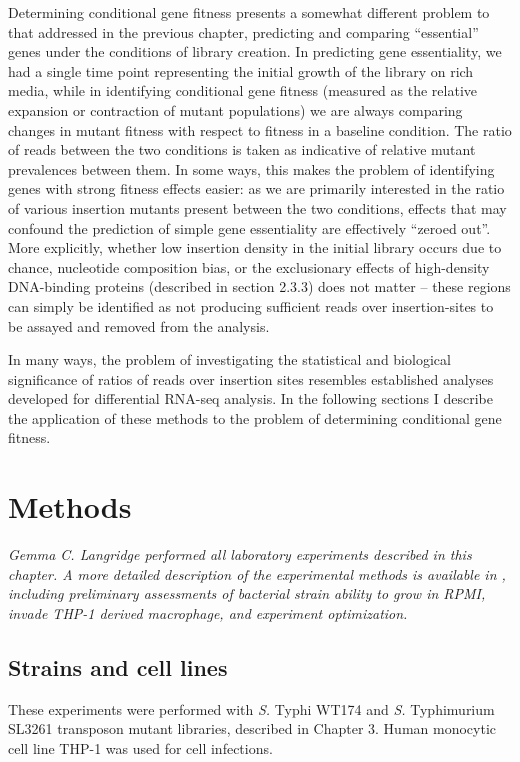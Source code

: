 Determining conditional gene fitness presents a somewhat different problem to that addressed in the previous chapter, predicting and comparing ``essential'' genes under the conditions of library creation. In predicting gene essentiality, we had a single time point representing the initial growth of the library on rich media, while in identifying conditional gene fitness (measured as the relative expansion or contraction of mutant populations) we are always comparing changes in mutant fitness with respect to fitness in a baseline condition. The ratio of reads between the two conditions is taken as indicative of relative mutant prevalences between them. In some ways, this makes the problem of identifying genes with strong fitness effects easier: as we are primarily interested in the ratio of various insertion mutants present between the two conditions, effects that may confound the prediction of simple gene essentiality are effectively ``zeroed out''. More explicitly, whether low insertion density in the initial library occurs due to chance, nucleotide composition bias, or the exclusionary effects of high-density DNA-binding proteins (described in section 2.3.3) does not matter -- these regions can simply be identified as not producing sufficient reads over insertion-sites to be assayed and removed from the analysis.

In many ways, the problem of investigating the statistical and biological significance of ratios of reads over insertion sites resembles established analyses developed for differential RNA-seq analysis. In the following sections I describe the application of these methods to the problem of determining conditional gene fitness.

\section{Methods}
\textit{Gemma C. Langridge performed all laboratory experiments described in this chapter. A more detailed description of the experimental methods is available in \textcite{Langridge2010}, including preliminary assessments of bacterial strain ability to grow in RPMI, invade THP-1 derived macrophage, and experiment optimization.}

\subsection{Strains and cell lines}
These experiments were performed with \textit{S.} Typhi WT174 and  \textit{S.} Typhimurium SL3261 transposon mutant libraries, described in Chapter 3. Human monocytic cell line THP-1 was used for cell infections.

